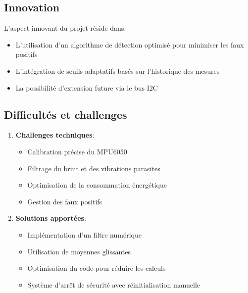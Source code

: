 \documentclass[12pt,a4paper]{article}
\begin{document}
\subsection{Innovation}
L'aspect innovant du projet réside dans:
\begin{itemize}
\item L'utilisation d'un algorithme de détection optimisé pour minimiser les faux positifs
\item L'intégration de seuils adaptatifs basés sur l'historique des mesures
\item La possibilité d'extension future via le bus I2C

\end{itemize}

\subsection{Difficultés et challenges}
\begin{enumerate}
\item \textbf{Challenges techniques}:
\begin{itemize}
\item Calibration précise du MPU6050
\item Filtrage du bruit et des vibrations parasites
\item Optimisation de la consommation énergétique
\item Gestion des faux positifs
\end{itemize}

\item \textbf{Solutions apportées}:
\begin{itemize}
\item Implémentation d'un filtre numérique
\item Utilisation de moyennes glissantes
\item Optimisation du code pour réduire les calculs
\item Système d'arrêt de sécurité avec réinitialisation manuelle
\end{itemize}
\end{enumerate}
\end{document}
